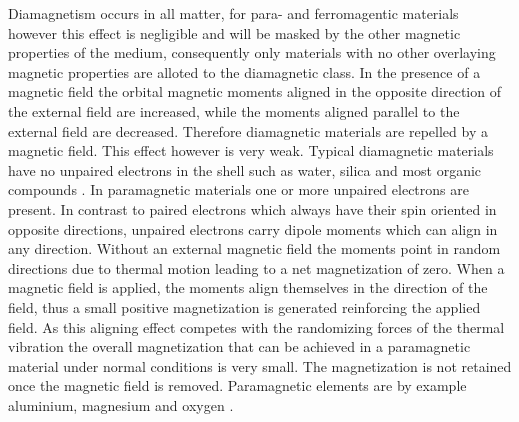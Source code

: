 Diamagnetism occurs in all matter, for para- and ferromagentic materials however this effect is negligible and will be masked by the other magnetic properties of the medium, consequently only materials with no other overlaying magnetic properties are alloted to the diamagnetic class. In the presence of a magnetic field the orbital magnetic moments aligned in the opposite direction of the external field are increased, while the moments aligned parallel to the external field are decreased. Therefore diamagnetic materials are repelled by a magnetic field. This effect however is very weak. Typical diamagnetic materials have no unpaired electrons in the shell such as water, silica and most organic compounds \cite{svoboda2004magnetic,griffiths2011elektrodynamik}.\newline
In paramagnetic materials one or more unpaired electrons are present. In contrast to paired electrons which always have their spin oriented in opposite directions, unpaired electrons carry dipole moments which can align in any direction. Without an external magnetic field the moments point in random directions due to thermal motion leading to a net magnetization of zero. When a magnetic field is applied, the moments align themselves in the direction of the field, thus a small positive magnetization is generated reinforcing the applied field. As this aligning effect competes with the randomizing forces of the thermal vibration the overall magnetization that can be achieved in a paramagnetic material under normal conditions is very small. The magnetization is not retained once the magnetic field is removed. Paramagnetic elements are by example aluminium, magnesium and oxygen \cite{svoboda2004magnetic,griffiths2011elektrodynamik}.\newline  %

